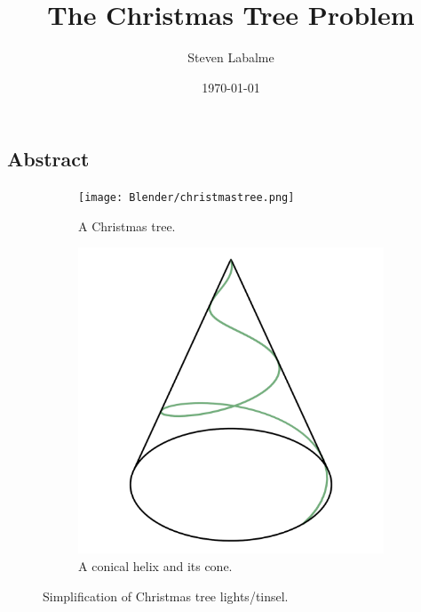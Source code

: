 \documentclass{article}
\title{The Christmas Tree Problem}
\author{Steven Labalme}
\date{\today}
\begin{document}
\maketitle
\newpage



\tableofcontents
\listoffigures
\newpage



\pagestyle{fancy}
\fancyhf{}
\renewcommand{\headrulewidth}{0em}
\setcounter{secnumdepth}{0}
\begin{center}
\section{Abstract}
\end{center}

\begin{figure}[h!]
    \centering
    \begin{subfigure}{0.3\linewidth}
        \texttt{[image: Blender/christmastree.png]}
        \caption{A Christmas tree.}
        \label{fig:helixa}
    \end{subfigure}
    \begin{subfigure}{0.4\linewidth}
        \includegraphics[width=\linewidth]{Blender/helix.png}
        \caption{A conical helix and its cone.}
        \label{fig:helixb}
    \end{subfigure}
    \caption{Simplification of Christmas tree lights/tinsel.}
    \label{fig:helix}
\end{figure}
\end{document}
